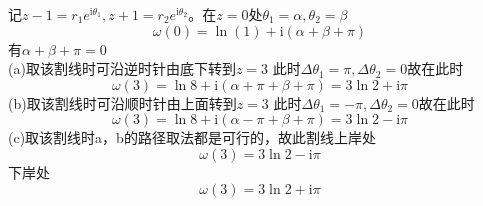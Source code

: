 \documentclass{phyasgn}
\renewcommand{\i}{\mathrm{i}}
\begin{document}
\begin{sol}[9]
    记$z-1=r_1e^{\i\theta_1},z+1=r_2e^{\i\theta_2}$。在$z=0$处$\theta_1=\alpha,\theta_2=\beta$\\
    $$\omega(0)=\ln (1)+\i(\alpha+\beta+\pi)$$
    有$\alpha+\beta+\pi=0$\\
    (a)取该割线时可沿逆时针由底下转到$z=3$
    此时$\Delta\theta_1=\pi,\Delta\theta_2=0$故在此时
    $$\omega(3)=\ln 8+\i(\alpha+\pi+\beta+\pi)=3\ln2+\i\pi$$
    (b)取该割线时可沿顺时针由上面转到$z=3$
    此时$\Delta\theta_1=-\pi,\Delta\theta_2=0$故在此时
    $$\omega(3)=\ln 8+\i(\alpha-\pi+\beta+\pi)=3\ln2-\i\pi$$
    (c)取该割线时a，b的路径取法都是可行的，故此割线上岸处
    $$\omega(3)=3\ln2-\i\pi$$
    下岸处
    $$\omega(3)=3\ln2+\i\pi$$


\end{sol}\par
\end{document}
